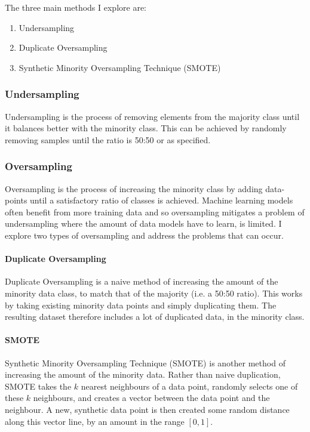 \documentclass[12pt,a4paper,twoside]{report}
\begin{document}
The three main methods I explore are:

\begin{enumerate}
  \item Undersampling 
  \item Duplicate Oversampling
  \item Synthetic Minority Oversampling Technique (SMOTE)
\end{enumerate}

\subsubsection{Undersampling}
Undersampling is the process of removing elements from the majority class until it balances better with the minority class. This can be achieved by randomly removing samples until the ratio is 50:50 or as specified. 

\subsubsection{Oversampling}
Oversampling is the process of increasing the minority class by adding data-points until a satisfactory ratio of classes is achieved. Machine learning models often benefit from more training data and so oversampling mitigates a problem of undersampling where the amount of data models have to learn, is limited. 
I explore two types of oversampling and address the problems that can occur.

\paragraph{Duplicate Oversampling} 
Duplicate Oversampling is a naive method of increasing the amount of the minority data class, to match that of the majority (i.e. a 50:50 ratio). This works by taking existing minority data points and simply duplicating them. The resulting dataset therefore includes a lot of duplicated data, in the minority class. 

\paragraph{SMOTE} 
Synthetic Minority Oversampling Technique (SMOTE)\cite{DBLP:journals/corr/abs-1106-1813} is another method of increasing the amount of the minority data. Rather than naive duplication, SMOTE takes the $k$ nearest neighbours of a data point, randomly selects one of these $k$ neighbours, and creates a vector between the data point and the neighbour. A new, synthetic data point is then created some random distance along this vector line, by an amount in the range $[0,1]$.
\end{document}
